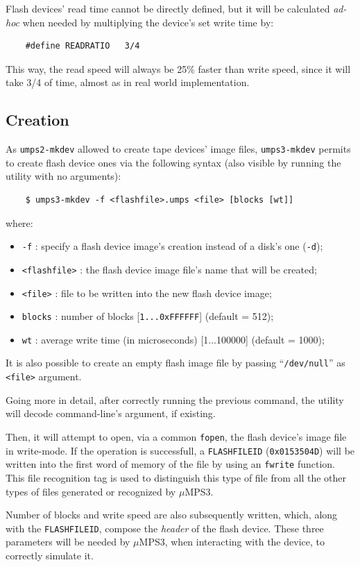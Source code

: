 \documentclass[12pt,a4paper,openright,twoside]{report}
\begin{document}
	Flash devices' read time cannot be directly defined, but it will be calculated \textit{ad-hoc} when needed by multiplying the device's set write time by: 
	\begin{verbatim}
	#define READRATIO   3/4
	\end{verbatim}
	This way, the read speed will always be 25\% faster than write speed, since it will take 3/4 of time, almost as in real world implementation.
	
\subsection{Creation}
	As \texttt{umps2-mkdev} allowed to create tape devices' image files, \texttt{umps3-mkdev} permits to create flash device ones via the following syntax (also visible by running the utility with no arguments):
	\begin{verbatim}
	$ umps3-mkdev -f <flashfile>.umps <file> [blocks [wt]]
	\end{verbatim}
	where:
	\begin{itemize}
	\item	\texttt{-f} : specify a flash device image's creation instead of a disk's one (\texttt{-d});
	\item	\texttt{<flashfile>} : the flash device image file's name that will be created;
	\item	\texttt{<file>} : file to be written into the new flash device image;
	\item	\texttt{blocks} : number of blocks [\texttt{1...0xFFFFFF}] (default = 512);
	\item	\texttt{wt} : average write time (in microseconds) [1...100000] (default = 1000);
	\end{itemize}
	It is also possible to create an empty flash image file by passing ``\texttt{/dev/null}'' as \texttt{<file>} argument.
	
	Going more in detail, after correctly running the previous command, the utility will decode command-line's argument, if existing.
	
  Then, it will attempt to open, via a common \texttt{fopen}, the flash device's image file in write-mode.
	If the operation is successfull, a \texttt{FLASHFILEID} (\texttt{0x0153504D}) will be written into the first word of memory of the file by using an \texttt{fwrite} function.
	This file recognition tag is used to distinguish this type of file from all the other types of files generated or recognized by $\mu$MPS3.
	
	Number of blocks and write speed are also subsequently written, which, along with the \texttt{FLASHFILEID}, compose the \textit{header} of the flash device.
	These three parameters will be needed by $\mu$MPS3, when interacting with the device, to correctly simulate it.
	
\end{document}
